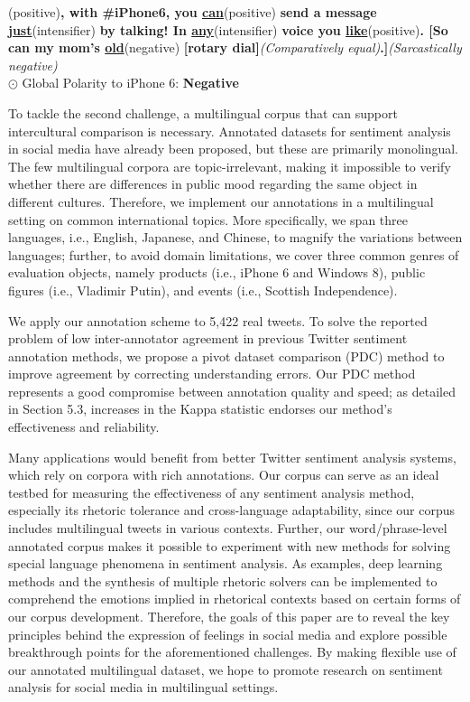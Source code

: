\documentclass[english]{jnlp_1.4}
\begin{document}
\vspace{0.5\Cvs}
(positive){\bf , with \#iPhone6, you \underline{can}}(positive) {\bf send a message \underline{just}}(intensifier) {\bf by talking! In \underline{any}}(intensifier) {\bf voice you \underline{like}}(positive){\bf . [So can my mom's \underline{old}}(negative) {\bf [rotary dial]}{\em (Comparatively equal)}{\bf .]}{\em (Sarcastically negative)}\\$\odot$ Global Polarity to iPhone 6: {\bf Negative}
\vspace{0.5\Cvs}

To tackle the second challenge, a multilingual corpus that can support intercultural comparison is necessary. Annotated datasets for sentiment analysis in social media have already been proposed, but these are primarily monolingual. The few multilingual corpora are topic-irrelevant, making it impossible to verify whether there are differences in public mood regarding the same object in different cultures. Therefore, we implement our annotations in a multilingual setting on common international topics. More specifically, we span three languages, i.e., English, Japanese, and Chinese, to magnify the variations between languages; further, to avoid domain limitations, we cover three common genres of evaluation objects, namely products (i.e., iPhone 6 and Windows 8), public figures (i.e., Vladimir Putin), and events (i.e., Scottish Independence).

We apply our annotation scheme to 5,422 real tweets. To solve the reported problem of low inter-annotator agreement in previous Twitter sentiment annotation methods, we propose a pivot dataset comparison (PDC) method to improve agreement by correcting understanding errors. Our PDC method represents a good compromise between annotation quality and speed; as detailed in Section 5.3, increases in the Kappa statistic endorses our method's effectiveness and reliability.

Many applications would benefit from better Twitter sentiment analysis systems, which rely on corpora with rich annotations. Our corpus can serve as an ideal testbed for measuring the effectiveness of any sentiment analysis method, especially its rhetoric tolerance and cross-language adaptability, since our corpus includes multilingual tweets in various contexts. Further, our word/phrase-level annotated corpus makes it possible to experiment with new methods for solving special language phenomena in sentiment analysis. As examples, deep learning methods and the synthesis of multiple rhetoric solvers can be implemented to comprehend the emotions implied in rhetorical contexts based on certain forms of our corpus development. Therefore, the goals of this paper are to reveal the key principles behind the expression of feelings in social media and explore possible breakthrough points for the aforementioned challenges. By making flexible use of our annotated multilingual dataset, we hope to promote research on sentiment analysis for social media in multilingual settings.
\end{document}
